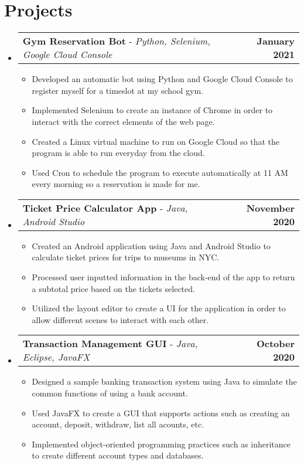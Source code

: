 \documentclass[letterpaper,11pt]{article}
\makeatletter
\newcommand{\resumeItem}[1]{
  \item\small{
    {#1 \vspace{-2pt}}
  }
}
\newcommand{\resumeProjectHeading}[2]{
    \item
    \begin{tabular*}{1.001\textwidth}{l@{\extracolsep{\fill}}r}
      \small#1 & \textbf{\small #2}\\
    \end{tabular*}\vspace{-7pt}
}
\newcommand{\resumeSubHeadingListStart}{\begin{itemize}[leftmargin=0.0in, label={}]}
\newcommand{\resumeSubHeadingListEnd}{\end{itemize}}
\newcommand{\resumeItemListStart}{\begin{itemize}}
\newcommand{\resumeItemListEnd}{\end{itemize}\vspace{-5pt}}
\makeatother
\begin{document}
\section{Projects}
    \vspace{-5pt}
    \resumeSubHeadingListStart
      \resumeProjectHeading
          {\textbf{Gym Reservation Bot} - \emph{Python, Selenium, Google Cloud Console}}{January 2021}
          \resumeItemListStart
            \resumeItem{Developed an automatic bot using Python and Google Cloud Console to register myself for a timeslot at my school gym.}
            \resumeItem{Implemented Selenium to create an instance of Chrome in order to interact with the correct elements of the web page.}
            \resumeItem{Created a Linux virtual machine to run on Google Cloud so that the program is able to run everyday from the cloud.}
            \resumeItem{Used Cron to schedule the program to execute automatically at 11 AM every morning so a reservation is made for me.}
          \resumeItemListEnd
          \vspace{-13pt}
      \resumeProjectHeading
          {\textbf{Ticket Price Calculator App} - \emph{Java, Android Studio}}{November 2020}
          \resumeItemListStart
            \resumeItem{Created an Android application using Java and Android Studio to calculate ticket prices for trips to museums in NYC.}
            \resumeItem{Processed user inputted information in the back-end of the app to return a subtotal price based on the tickets selected.}
            \resumeItem{Utilized the layout editor to create a UI for the application in order to allow different scenes to interact with each other.}
          \resumeItemListEnd 
          \vspace{-13pt}
          \resumeProjectHeading
          {\textbf{Transaction Management GUI} - \emph{Java, Eclipse, JavaFX}}{October 2020}
          \resumeItemListStart
            \resumeItem{Designed a sample banking transaction system using Java to simulate the common functions of using a bank account.}
            \resumeItem{Used JavaFX to create a GUI that supports actions such as creating an account, deposit, withdraw, list all acounts, etc.}
            \resumeItem{Implemented object-oriented programming practices such as inheritance to create different account types and databases.}
          \resumeItemListEnd 
    \resumeSubHeadingListEnd
\vspace{-15pt}



\end{document}
